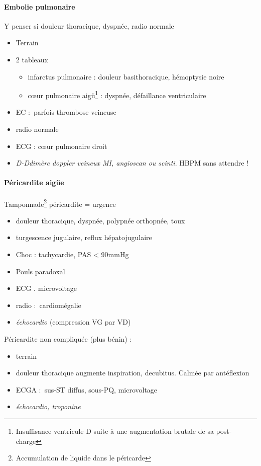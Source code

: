 \documentclass{article}
\begin{document}
\paragraph{Embolie pulmonaire} Y penser si douleur thoracique, dyspnée, radio
normale \skull
\begin{itemize}
  \item Terrain
  \item 2 tableaux
    \begin{itemize}
      \item infarctus pulmonaire : douleur basithoracique, hémoptysie noire
      \item c\oe{}ur pulmonaire aigü\footnote{Insuffisance ventricule D suite à
          une augmentation brutale de sa post-charge} : dyspnée, défaillance ventriculaire
    \end{itemize}
  \item EC : parfois thrombose veineuse
  \item radio normale
  \item ECG : c\oe{}ur pulmonaire droit
  \item \textit{D-Ddimère \thus doppler veineux MI, angioscan ou scinti}. HBPM sans
    attendre !
\end{itemize}

\paragraph{Péricardite aigüe}
Tamponnade\footnote{Accumulation de liquide dans le péricarde} péricardite = urgence \skull
\begin{itemize}
  \item douleur thoracique, dyspnée, polypnée \thus orthopnée, toux
  \item turgescence jugulaire, reflux hépatojugulaire
  \item Choc : tachycardie, PAS < 90mmHg
  \item Pouls paradoxal
  \item ECG . microvoltage
  \item radio : cardiomégalie
  \item \textit{échocardio}  (compression VG par VD)
\end{itemize}

Péricardite non compliquée (plus bénin) :
\begin{itemize}
  \item terrain
  \item douleur thoracique augmente inspiration, decubitus. Calmée par
    antéflexion
  \item ECGA : sus-ST diffus, sous-PQ, microvoltage
  \item \textit{échocardio, troponine} 
\end{itemize}
\end{document}
